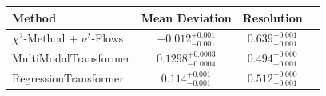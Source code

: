     \begin{tabular}{lccc}
        \toprule
        Method & Mean Deviation & Resolution \\
        \midrule
        $\chi^2$-Method + $\nu^2$-Flows & $-0.012_{-0.001}^{+0.001}$ & $0.639_{-0.001}^{+0.001}$ \\
        MultiModalTransformer & $0.1298_{-0.0004}^{+0.0003}$ & $0.494_{-0.001}^{+0.000}$ \\
        RegressionTransformer & $0.114_{-0.001}^{+0.001}$ & $0.512_{-0.001}^{+0.000}$ \\
        \bottomrule
    \end{tabular}